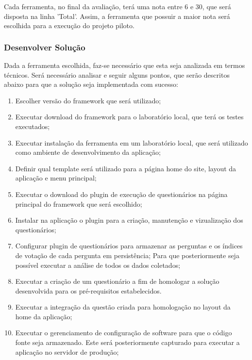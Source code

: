 Cada ferramenta, no final da avaliação, terá uma nota entre 6 e 30, que será disposta na linha 'Total'. Assim, a ferramenta que possuir a maior nota será escolhida para a execução do projeto piloto.

\subsubsection{Desenvolver Solução}
\label{sub:definir_tecnologia}

Dada a ferramenta escolhida, faz-se necessário que esta seja analizada em termos técnicos. Será necessário analisar e seguir alguns pontos, que
serão descritos abaixo para que a solução seja implementada com sucesso:

\begin{enumerate}
    \item Escolher versão do framework que será utilizado;
    \item Executar download do framework para o laboratório local, que terá os testes executados;
    \item Executar instalação da ferramenta em um laboratório local, que será utilizado como ambiente de
        desenvolvimento da aplicação;
    \item Definir qual template será utilizado para a página home do site, layout da aplicação e menu principal;
    \item Executar o download do plugin de execução de questionários na página principal do framework que será escolhido;
    \item Instalar na aplicação o plugin para a criação, manutenção e vizualização dos questionários;
    \item Configurar plugin de questionários para armazenar as perguntas e os índices de votação de cada pergunta em persistência;
        Para que posteriormente seja possível executar a análise de todos os dados coletados;
    \item Executar a criação de um questionário a fim de homologar a solução desenvolvida para os pré-requisitos estabelecidos. 
    \item Executar a integração da questão criada para homologação no layout da home da aplicação;
    \item Executar o gerenciamento de configuração de software para que o código fonte seja armazenado. Este será posteriormente
        capturado para executar a aplicação no servidor de produção;
\end{enumerate}

